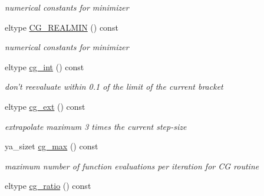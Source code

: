 \begin{CompactItemize}
\begin{CompactList}\small\item\em numerical constants for minimizer \item\end{CompactList}\item 
\hypertarget{class_y_a_a_t_e_reduce_a33}{
eltype \hyperlink{class_y_a_a_t_e_reduce_a33}{CG\_\-REALMIN} () const }
\label{class_y_a_a_t_e_reduce_a33}

\begin{CompactList}\small\item\em numerical constants for minimizer \item\end{CompactList}\item 
\hypertarget{class_y_a_a_t_e_reduce_a34}{
eltype \hyperlink{class_y_a_a_t_e_reduce_a34}{cg\_\-int} () const }
\label{class_y_a_a_t_e_reduce_a34}

\begin{CompactList}\small\item\em don't reevaluate within 0.1 of the limit of the current bracket \item\end{CompactList}\item 
\hypertarget{class_y_a_a_t_e_reduce_a35}{
eltype \hyperlink{class_y_a_a_t_e_reduce_a35}{cg\_\-ext} () const }
\label{class_y_a_a_t_e_reduce_a35}

\begin{CompactList}\small\item\em extrapolate maximum 3 times the current step-size \item\end{CompactList}\item 
\hypertarget{class_y_a_a_t_e_reduce_a36}{
ya\_\-sizet \hyperlink{class_y_a_a_t_e_reduce_a36}{cg\_\-max} () const }
\label{class_y_a_a_t_e_reduce_a36}

\begin{CompactList}\small\item\em maximum number of function evaluations per iteration for CG routine \item\end{CompactList}\item 
\hypertarget{class_y_a_a_t_e_reduce_a37}{
eltype \hyperlink{class_y_a_a_t_e_reduce_a37}{cg\_\-ratio} () const }
\label{class_y_a_a_t_e_reduce_a37}


\end{CompactItemize}
